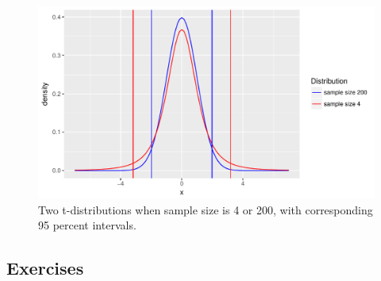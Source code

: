 \documentclass[]{report}\usepackage[]{graphicx}\usepackage[]{color}
\makeatletter
\def\maxwidth{ %
  \ifdim\Gin@nat@width>\linewidth
    \linewidth
  \else
    \Gin@nat@width
  \fi
}
\newenvironment{knitrout}{}{} %
\makeatother
\begin{document}
\begin{knitrout}
\color{fgcolor}\begin{figure}

{\centering \includegraphics[width=\maxwidth]{figure/inf_10-1} 

}

\caption[Two t-distributions when sample size is 4 or 200, with corresponding 95 percent intervals]{Two t-distributions when sample size is 4 or 200, with corresponding 95 percent intervals.}\label{fig:inf_10}
\end{figure}


\end{knitrout}




\subsection{Exercises}
\end{document}
